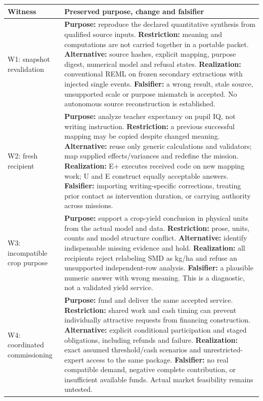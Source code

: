 \documentclass[11pt]{article}
\begin{document}
\begin{longtable}{p{}p{}}
\toprule
Witness & Preserved purpose, change and falsifier\\
\midrule
\endhead
W1: snapshot revalidation & \textbf{Purpose:} reproduce the declared quantitative synthesis from qualified source inputs. \textbf{Restriction:} meaning and computations are not carried together in a portable packet. \textbf{Alternative:} source hashes, explicit mapping, purpose digest, numerical model and refusal states. \textbf{Realization:} conventional REML on frozen secondary extractions with injected single events. \textbf{Falsifier:} a wrong result, stale source, unsupported scale or purpose mismatch is accepted. No autonomous source reconstruction is established.\\
W2: fresh recipient & \textbf{Purpose:} analyze teacher expectancy on pupil IQ, not writing instruction. \textbf{Restriction:} a previous successful mapping may be copied despite changed meaning. \textbf{Alternative:} reuse only generic calculations and validators; map supplied effects/variances and redefine the mission. \textbf{Realization:} E+ executes received code on new mapping work; U and E construct equally acceptable answers. \textbf{Falsifier:} importing writing-specific corrections, treating prior contact as intervention duration, or carrying authority across missions.\\
W3: incompatible crop purpose & \textbf{Purpose:} support a crop-yield conclusion in physical units from the actual model and data. \textbf{Restriction:} prose, units, counts and model structure conflict. \textbf{Alternative:} identify indispensable missing evidence and hold. \textbf{Realization:} all recipients reject relabeling SMD as kg/ha and refuse an unsupported independent-row analysis. \textbf{Falsifier:} a plausible numeric answer with wrong meaning. This is a diagnostic, not a validated yield service.\\
W4: coordinated commissioning & \textbf{Purpose:} fund and deliver the same accepted service. \textbf{Restriction:} shared work and cash timing can prevent individually attractive requests from financing construction. \textbf{Alternative:} explicit conditional participation and staged obligations, including refunds and failure. \textbf{Realization:} exact assumed threshold/cash scenarios and unrestricted-expert access to the same package. \textbf{Falsifier:} no real compatible demand, negative complete contribution, or insufficient available funds. Actual market feasibility remains untested.\\
\bottomrule
\end{longtable}
\end{document}
